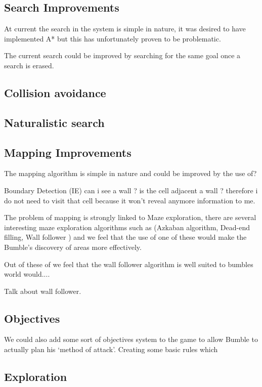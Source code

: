 \documentclass[a4paper,oneside]{report}
\begin{document}
\subsection{Search Improvements}

At current the search in the system is simple in nature, it was desired to have implemented A* but this has unfortunately proven to be problematic.
		
The current search could be improved by searching for the same goal once a search is erased.
				
\subsection{Collision avoidance}
		
\subsection{Naturalistic search} 
		
\subsection{Mapping Improvements}

The mapping algorithm is simple in nature and could be improved by the use of? 
		
Boundary Detection (IE) can i see a wall ? is the cell adjacent a wall ? therefore i do not need to visit that cell because it won't reveal anymore information to me. 
	
The problem of mapping is strongly linked to Maze exploration, there are several interesting maze exploration algorithms such as (Azkaban algorithm, Dead-end filling, Wall follower ) and we feel that the use of one of these would make the Bumble's discovery of areas more effectively. 
	
		Out of these of  we feel that the wall follower algorithm is well suited to bumbles world would.... 
		
		Talk about wall follower.
		
\subsection{Objectives}

We could also add some sort of objectives system to the game to allow Bumble to actually plan his `method of attack'. Creating some basic rules which 

\subsection{Exploration}
\end{document}
